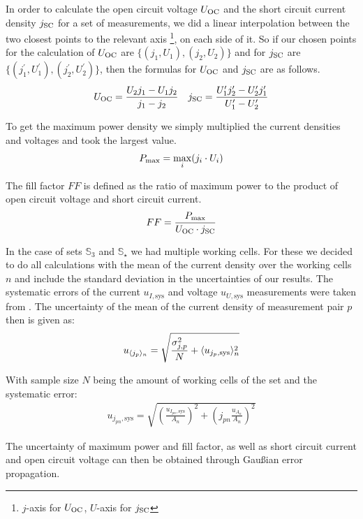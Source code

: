 In order to calculate the open circuit voltage $U_{\text{OC}}$ and the short circuit current density $j_{\text{SC}}$ for a set of measurements, we did a linear interpolation between the two closest points to the relevant axis \footnote{$j$-axis for $U_{\text{OC}}$, $U$-axis for $j_{\text{SC}}$}, on each side of it. So if our chosen points for the calculation of $U_{\text{OC}}$ are $\{(j_1,U_1),(j_2,U_2)\}$ and for $j_{\text{SC}}$ are $\{(j_1^\prime,U_1^\prime),(j_2^\prime,U_2^\prime)\}$, then the formulas for $U_{\text{OC}}$ and $j_{\text{SC}}$ are as follows.
\begin{align}
U_{\text{OC}} = \frac{U_2 j_1 - U_1 j_2}{j_1-j_2}\quad j_{\text{SC}} = \frac{U_1^\prime j_2^\prime - U_2^\prime j_1^\prime}{U_1^\prime-U_2^\prime}
\end{align}

To get the maximum power density we simply multiplied the current densities and voltages and took the largest value.
\begin{align}
P_{\text{max}} = \max_{i} (j_i\cdot U_i)
\end{align}

The fill factor $FF$ is defined as the ratio of maximum power to the product of open circuit voltage and short circuit current.
\begin{align}
FF = \frac{P_{\text{max}}}{U_{\text{OC}} \cdot j_{\text{SC}}}
\end{align}

In the case of sets $\mathbb{S}_3$ and $\mathbb{S}_\star$ we had multiple working cells. For these we decided to do all calculations with the mean of the current density over the working cells $n$ and include the standard deviation in the uncertainties of our results. The systematic errors of the current $u_{I,\text{sys}}$ and voltage $u_{U,\text{sys}}$ measurements were taken from \cite{keithley}. The uncertainty of the mean of the current density of measurement pair $p$ then is given as:
\begin{align}
u_{\langle j_p \rangle_n} = \sqrt{\frac{\sigma_{j,p}^2}{N} + \langle u_{j_p,\text{sys}} \rangle_n^2}
\end{align}

With sample size $N$ being the amount of working cells of the set and the systematic error:
\begin{align}
u_{j_{pn},\text{sys}} = \sqrt{ \left( \frac{ u_{I_{pn},\text{sys}}}{A_n}\right)^2+\left( j_{pn}\frac{u_{A_n}}{A_n} \right)^2}
\end{align}

The uncertainty of maximum power and fill factor, as well as short circuit current and open circuit voltage can then be obtained through Gaußian error propagation.


